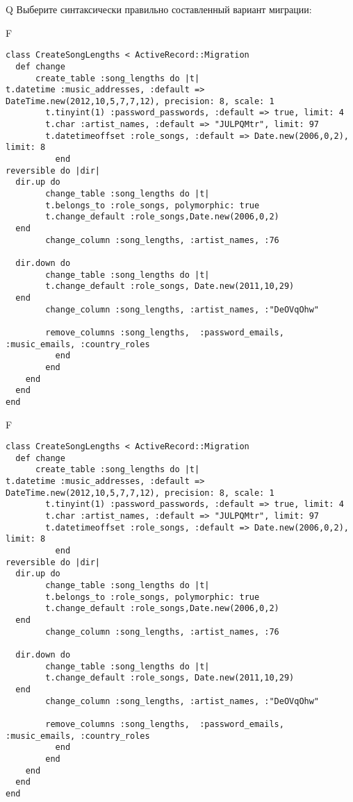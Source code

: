 Q
Выберите синтаксически правильно составленный вариант миграции:

F
\begin{verbatim}
class CreateSongLengths < ActiveRecord::Migration
  def change
	  create_table :song_lengths do |t|
t.datetime :music_addresses, :default => DateTime.new(2012,10,5,7,7,12), precision: 8, scale: 1
		t.tinyint(1) :password_passwords, :default => true, limit: 4
		t.char :artist_names, :default => "JULPQMtr", limit: 97
		t.datetimeoffset :role_songs, :default => Date.new(2006,0,2), limit: 8
		  end
reversible do |dir|
  dir.up do
		change_table :song_lengths do |t|
		t.belongs_to :role_songs, polymorphic: true
 		t.change_default :role_songs,Date.new(2006,0,2)
  end
 		change_column :song_lengths, :artist_names, :76
   
  dir.down do
		change_table :song_lengths do |t|
		t.change_default :role_songs, Date.new(2011,10,29)
  end
 		change_column :song_lengths, :artist_names, :"DeOVqOhw"
   
		remove_columns :song_lengths,  :password_emails, :music_emails, :country_roles 
	      end
	    end
    end 
  end
end

\end{verbatim}

F
\begin{verbatim}
class CreateSongLengths < ActiveRecord::Migration
  def change
	  create_table :song_lengths do |t|
t.datetime :music_addresses, :default => DateTime.new(2012,10,5,7,7,12), precision: 8, scale: 1
		t.tinyint(1) :password_passwords, :default => true, limit: 4
		t.char :artist_names, :default => "JULPQMtr", limit: 97
		t.datetimeoffset :role_songs, :default => Date.new(2006,0,2), limit: 8
		  end
reversible do |dir|
  dir.up do
		change_table :song_lengths do |t|
		t.belongs_to :role_songs, polymorphic: true
 		t.change_default :role_songs,Date.new(2006,0,2)
  end
 		change_column :song_lengths, :artist_names, :76
   
  dir.down do
		change_table :song_lengths do |t|
		t.change_default :role_songs, Date.new(2011,10,29)
  end
 		change_column :song_lengths, :artist_names, :"DeOVqOhw"
   
		remove_columns :song_lengths,  :password_emails, :music_emails, :country_roles 
	      end
	    end
    end 
  end
end

\end{verbatim}


